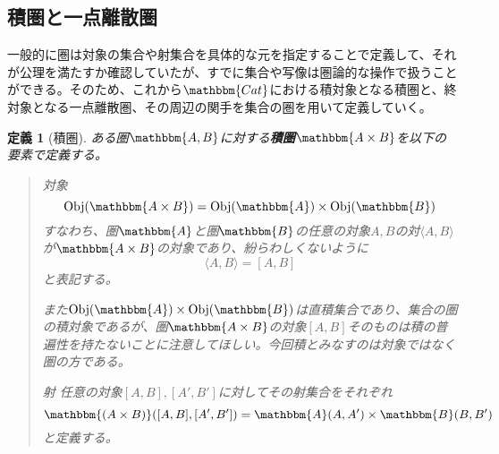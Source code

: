 \documentclass[uplatex,dvipdfmx]{jsarticle}
\newcommand{\cat}[1]{\mathbbm{#1}}
\newcommand{\tuple}[1]{\langle #1\rangle}
\newcommand{\obj}[1]{\mathrm{Obj}(\cat{#1})}
\newcommand{\arset}[3]{\cat{#1}(#2,#3)}
\newcommand{\pcobj}[1]{[#1]}
\newtheorem{define}[proof]{定義}
\numberwithin{proof}{subsection}
\newenvironment{mydescription}
{\begin{description}
  \setlength{\parskip}{0.5cm}
}
{\end{description}}
\begin{document}
	\subsection{積圏と一点離散圏}
  一般的に圏は対象の集合や射集合を具体的な元を指定することで定義して、それが公理を満たすか確認していたが、すでに集合や写像は圏論的な操作で扱うことができる。そのため、これから$\cat{Cat}$における積対象となる積圏と、終対象となる一点離散圏、その周辺の関手を集合の圏を用いて定義していく。
	\begin{define}[積圏]
		ある圏$\cat{A,B}$に対する\textbf{積圏}$\cat{A\times B}$を以下の要素で定義する。
		\begin{quote}
			\begin{mydescription}
				\item[対象] \[\obj{A\times B}=\obj{A}\times\obj{B}\]
				すなわち、圏$\cat{A}$と圏$\cat{B}$の任意の対象$A,B$の対$\tuple{A,B}$が$\cat{A\times B}$の対象であり、紛らわしくないように\[\tuple{A,B}=\pcobj{A,B}\]と表記する。

				また$\obj{A}\times\obj{B}$は直積集合であり、集合の圏の積対象であるが、圏$\cat{A\times B}$の対象$\pcobj{A,B}$そのものは積の普遍性を持たないことに注意してほしい。今回積とみなすのは対象ではなく圏の方である。
				\item[射]任意の対象$\pcobj{A,B},\pcobj{A',B'}$に対してその射集合をそれぞれ\[\arset{(A\times B)}{\pcobj{A,B}}{\pcobj{A',B'}}=\arset{A}{A}{A'}\times\arset{B}{B}{B'}\]と定義する。


\end{mydescription}
\end{quote}
\end{define}
\end{document}
